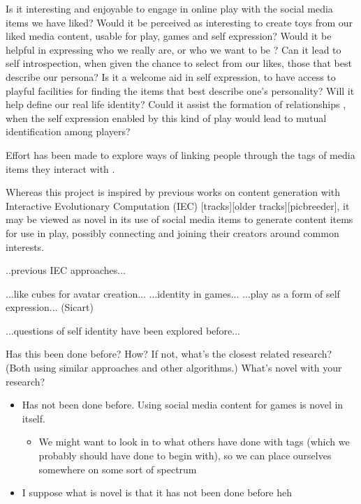 \documentclass[]{article}
\begin{document}
Is it interesting and enjoyable to engage in online play with the social media items we have liked?  Would it be perceived as interesting to create toys from our liked media content, usable for play, games and self expression?   Would it be helpful in expressing who we really are, or who we want to be \cite{przybylski2012ideal}?  Can it lead to self introspection, when given the chance to select from our likes, those that best describe our persona?  
Is it a welcome aid in self expression, to have access to playful facilities for finding the items that best describe one's personality?
Will it help define our real life identity?  Could it assist the formation of relationships \cite{vitak2008facebook}, when the self expression enabled by this kind of play would lead to mutual identification \cite{kimmel1966game} among players?

 Effort has been made to explore ways of linking people through the tags of media items they interact with \cite{guy2010social}\cite{hung2008tag}.  

Whereas this project is inspired by previous works on content generation with Interactive Evolutionary Computation (IEC) [tracks][older tracks][picbreeder], it may be viewed as novel in its use of social media items to generate content items for use in play, possibly connecting and joining their creators around common interests.

..previous IEC approaches...

...like cubes for avatar creation...
...identity in games...
...play as a form of self expression... (Sicart)

...questions of self identity have been explored before...


\begin{framed}
Has this been done before? How? If not, what’s the closest related research? (Both using similar approaches and other algorithms.) What’s novel with your research?
\end{framed}

\begin{itemize}
\item Has not been done before. Using social media content for games is novel in itself.
	\begin{itemize}
	\item We might want to look in to what others have done with tags (which we probably should have done to begin with), so we can place ourselves somewhere on some sort of spectrum
	\end{itemize}
\item I suppose what is novel is that it has not been done before heh
\end{itemize}
\end{document}
